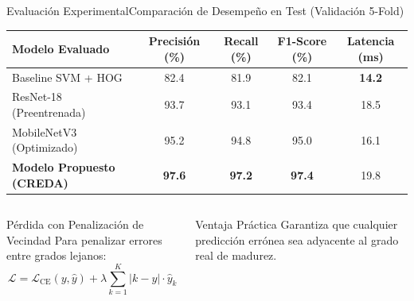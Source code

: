 \documentclass[aspectratio=169, 10pt]{beamer}
\begin{document}
\begin{frame}{Evaluación Experimental}{Comparación de Desempeño en Test (Validación 5-Fold)}
    \begin{table}
        \centering
        \footnotesize
        \renewcommand{\arraystretch}{1.2}
        \begin{tabular}{l c c c c}
            \toprule
            \rowcolor{LightBg}
            \textbf{Modelo Evaluado} & \textbf{Precisión (\%)} & \textbf{Recall (\%)} & \textbf{F1-Score (\%)} & \textbf{Latencia (ms)} \\
            \midrule
            Baseline SVM + HOG & 82.4 & 81.9 & 82.1 & \textbf{14.2} \\
            ResNet-18 (Preentrenada) & 93.7 & 93.1 & 93.4 & 18.5 \\
            MobileNetV3 (Optimizado) & 95.2 & 94.8 & 95.0 & 16.1 \\
            \textbf{Modelo Propuesto (CREDA)} & \textbf{97.6} & \textbf{97.2} & \textbf{97.4} & 19.8 \\
            \bottomrule
        \end{tabular}
    \end{table}

    \vspace{0.15cm}
    \begin{columns}[T]
        \begin{block}{Pérdida con Penalización de Vecindad}
            Para penalizar errores entre grados lejanos:
            \begin{equation*}
                \mathcal{L} = \mathcal{L}_{\text{CE}}(y, \hat{y}) + \lambda \sum_{k=1}^K |k - y| \cdot \hat{y}_k
            \end{equation*}
        \end{block}

        \begin{exampleblock}{Ventaja Práctica}
            Garantiza que cualquier predicción errónea sea adyacente al grado real de madurez.
        \end{exampleblock}
    \end{columns}
\end{frame}
\end{document}

